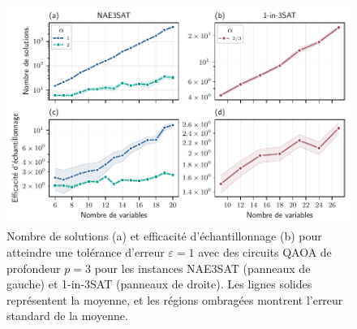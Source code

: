 \begin{figure}[H]
    \centering
    \includegraphics[width=1\textwidth]{figures/sampling-efficiency.pdf}
    \caption[Efficacité de l'échantillonnage pour des problèmes \#P-difficile]{Nombre de solutions (a) et efficacité d'échantillonnage (b) pour atteindre une tolérance d'erreur $\varepsilon = 1$ avec des circuits QAOA de profondeur $p=3$ pour les instances NAE3SAT (panneaux de gauche) et 1-in-3SAT (panneaux de droite). Les lignes solides représentent la moyenne, et les régions ombragées montrent l'erreur standard de la moyenne.}
    \label{fig:sampling-efficiency}
\end{figure}


